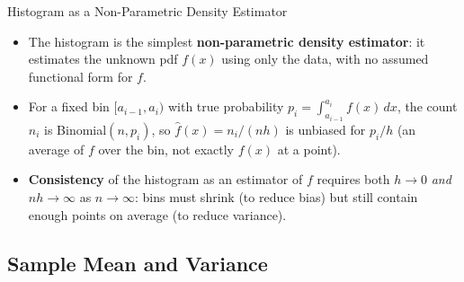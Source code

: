 \documentclass[11pt,aspectratio=169]{beamer}
\begin{document}
\begin{frame}{Histogram as a Non-Parametric Density Estimator}
\begin{itemize}
  \item The histogram is the simplest \textbf{non-parametric density
        estimator}: it estimates the unknown pdf $f(x)$ using only the data,
        with no assumed functional form for $f$.
  \item For a fixed bin $[a_{i-1},a_i)$ with true probability
        $p_i = \int_{a_{i-1}}^{a_i} f(x)\,dx$, the count $n_i$ is Binomial$(n,p_i)$, so
        $\hat f(x) = n_i/(nh)$ is unbiased for $p_i/h$ (an average of $f$
        over the bin, not exactly $f(x)$ at a point).
  \item \textbf{Consistency} of the histogram as an estimator of $f$
        requires both $h \to 0$ \emph{and} $nh \to \infty$ as
        $n \to \infty$: bins must shrink (to reduce bias) but still contain
        enough points on average (to reduce variance).
\end{itemize}
\end{frame}

\subsection{Sample Mean and Variance}
\end{document}
